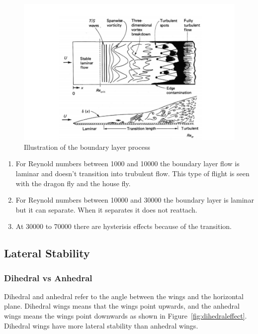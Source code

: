 \begin{figure}[hl]
  \centering
    \includegraphics[scale=.5]{figures/boundary_layer_transition.png}
    \caption{Illustration of the boundary layer process}
  \label{fig:boundary_layer_transition}
\end{figure}



\begin{enumerate}
\item For Reynold numbers between 1000 and 10000 the boundary layer flow is laminar
and doesn't transition into trubulent flow. This type of flight is seen with
the dragon fly and the house fly. 
\item  For Reynold numbers between 10000 and 30000 the boundary layer is laminar but
it can separate. When it separates it does not reattach.
\item At 30000 to 70000 there are hysterisis effects because of the transition. 

\end{enumerate}

\subsection{Lateral Stability}

\subsubsection{Dihedral vs Anhedral}

Dihedral and anhedral refer to the angle between the wings and the horizontal plane.
Dihedral wings means that the wings point upwards, and the anhedral wings means the wings point
downwards as shown in Figure~\ref{fig:dihedraleffect}. Dihedral wings have more lateral 
stability than anhedral wings.

